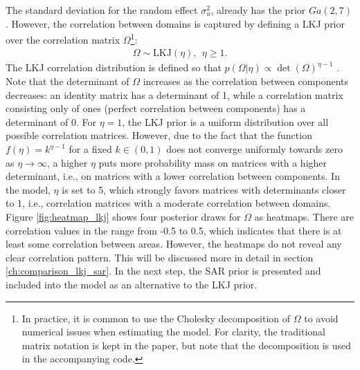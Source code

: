 The standard deviation for the random effect $\sigma_u^2$, already has the prior $Ga(2, 7)$.
However, the correlation between domains is captured by defining a LKJ prior over the correlation matrix $\Omega$\footnote{In practice, it is common to use the Cholesky decomposition of $\Omega$ to avoid numerical issues when estimating the model.
For clarity, the traditional matrix notation is kept in the paper, but note that the decomposition is used in the accompanying code.}:
\begin{gather*}
    \Omega \sim \text{LKJ}(\eta), ~~ \eta \ge 1.
\end{gather*}
The LKJ correlation distribution is defined so that $p(\Omega|\eta) \propto \det(\Omega)^{\eta - 1}$ \citep[Chapter 1.13]{stan_development_team_stan_2021}.
Note that the determinant of $\Omega$ increases as the correlation between components decreases:
an identity matrix has a determinant of 1, while a correlation matrix consisting only of ones (perfect correlation between components) has a determinant of 0.
For $\eta = 1$, the LKJ prior is a uniform distribution over all possible correlation matrices.
However, due to the fact that the function $f(\eta) = k^{\eta-1}$ for a fixed $k \in (0, 1)$ does not converge uniformly towards zero as $\eta \rightarrow \infty$, a higher $\eta$ puts more probability mass on matrices with a higher determinant, i.e., on matrices with a lower correlation between components.
In the model, $\eta$ is set to 5, which strongly favors matrices with determinants closer to 1, i.e., correlation matrices with a moderate correlation between domains.
Figure \ref{fig:heatmap_lkj} shows four posterior draws for $\Omega$ as heatmaps.
There are correlation values in the range from -0.5 to 0.5, which indicates that there is at least some correlation between areas.
However, the heatmaps do not reveal any clear correlation pattern.
This will be discussed more in detail in section \ref{ch:comparison_lkj_sar}.
In the next step, the SAR prior is presented and included into the model as an alternative to the LKJ prior.






